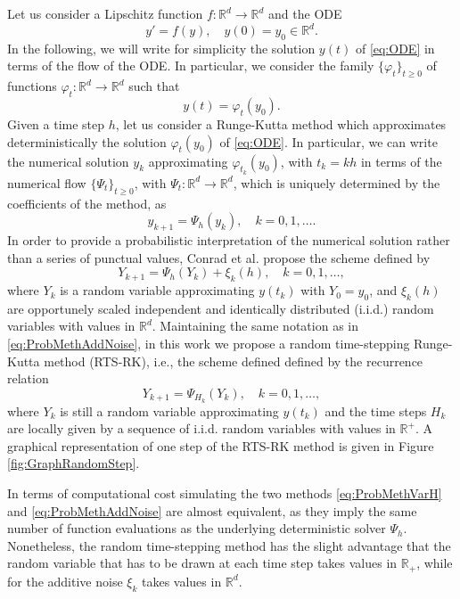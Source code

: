 \documentclass{siamart1116}
\numberwithin{theorem}{section}
\renewcommand{\phi}{\varphi}
\newcommand{\R}{\mathbb{R}}
\begin{document}
Let us consider a Lipschitz function $f\colon\R^d\to\R^d$ and the ODE
\begin{equation}\label{eq:ODE}
	y' = f(y), \quad y(0) = y_0 \in \R^d.
\end{equation}
In the following, we will write for simplicity the solution $y(t)$ of \eqref{eq:ODE} in terms of the flow of the ODE. In particular, we consider the family  $\{\phi_t\}_{t \geq 0}$ of functions $\phi_t\colon\R^d\to\R^d$ such that 
\begin{equation}
	y(t) = \phi_t(y_0).
\end{equation}
Given a time step $h$, let us consider a Runge-Kutta method which approximates deterministically the solution $\phi_t(y_0)$ of \eqref{eq:ODE}. In particular, we can write the numerical solution $y_k$ approximating $\phi_{t_k}(y_0)$, with $t_k = kh$ in terms of the numerical flow $\{\Psi_t\}_{t \geq 0}$, with $\Psi_t\colon\R^d\to\R^d$, which is uniquely determined by the coefficients of the method, as
\begin{equation}
	y_{k+1} = \Psi_h(y_k), \quad k = 0, 1, \ldots.
\end{equation}
In order to provide a probabilistic interpretation of the numerical solution rather than a series of punctual values, Conrad et al. propose the scheme defined by
\begin{equation}\label{eq:ProbMethAddNoise}
	Y_{k+1} = \Psi_h(Y_{k}) + \xi_k(h), \quad k = 0, 1, \ldots,
\end{equation}
where $Y_k$ is a random variable approximating $y(t_k)$ with $Y_0 = y_0$, and $\xi_k(h)$ are opportunely scaled independent and identically distributed (i.i.d.) random variables with values in $\R^d$. Maintaining the same notation as in \eqref{eq:ProbMethAddNoise}, in this work we propose a random time-stepping Runge-Kutta method (RTS-RK), i.e., the scheme defined defined by the recurrence relation
\begin{equation}\label{eq:ProbMethVarH}
	Y_{k+1} = \Psi_{H_k}(Y_k), \quad k = 0, 1, \ldots,
\end{equation}
where $Y_k$ is still a random variable approximating $y(t_k)$ and the time steps $H_k$ are locally given by a sequence  of i.i.d. random variables with values in $\R^+$. A graphical representation of one step of the RTS-RK method is given in Figure \ref{fig:GraphRandomStep}.
\begin{remark} In terms of computational cost simulating the two methods \eqref{eq:ProbMethVarH} and \eqref{eq:ProbMethAddNoise} are almost equivalent, as they imply the same number of function evaluations as the underlying deterministic solver $\Psi_h$. Nonetheless, the random time-stepping method has the slight advantage that the random variable that has to be drawn at each time step takes values in $\R_+$, while for the additive noise $\xi_k$ takes values in $\R^d$.
\end{remark}
\end{document}
